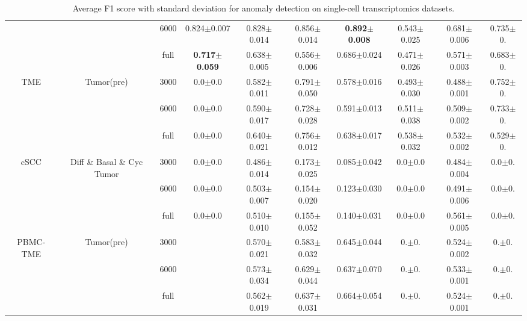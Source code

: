 \documentclass{article}
\begin{document}
\begin{table}
{\begin{tabular}{cccccccccc}
        & & 6000 & 0.824$\pm$0.007 & 0.828$\pm$0.014 & 0.856$\pm$0.014 & \textbf{0.892$\pm$0.008} & 0.543$\pm$0.025 & 0.681$\pm$0.006 & 0.735$\pm$0. \\
        & & full & \textbf{0.717$\pm$0.059} & 0.638$\pm$0.005 & 0.556$\pm$0.006 & 0.686$\pm$0.024 & 0.471$\pm$0.026 & 0.571$\pm$0.003 & 0.683$\pm$0. \\
        \hline
        \multirow{3}{*}{\centering TME} & \multirow{3}{*}{\centering Tumor(pre)} & 3000 & 0.0$\pm$0.0 & 0.582$\pm$0.011 & 0.791$\pm$0.050 & 0.578$\pm$0.016 & 0.493$\pm$0.030 & 0.488$\pm$0.001 & 0.752$\pm$0. \\
        & & 6000 & 0.0$\pm$0.0 & 0.590$\pm$0.017 & 0.728$\pm$0.028 & 0.591$\pm$0.013 & 0.511$\pm$0.038 & 0.509$\pm$0.002 & 0.733$\pm$0. \\
        & & full & 0.0$\pm$0.0 & 0.640$\pm$0.021 & 0.756$\pm$0.012 & 0.638$\pm$0.017 & 0.538$\pm$0.032 & 0.532$\pm$0.002 & 0.529$\pm$0. \\
        \hline
        \multirow{3}{*}{\centering cSCC} & \multirow{3}{*}{\centering Diff \& Basal \& Cyc Tumor} & 3000 & 0.0$\pm$0.0 & 0.486$\pm$0.014 & 0.173$\pm$0.025 & 0.085$\pm$0.042 & 0.0$\pm$0.0 & 0.484$\pm$0.004 & 0.0$\pm$0. \\
        & & 6000 & 0.0$\pm$0.0 & 0.503$\pm$0.007 & 0.154$\pm$0.020 & 0.123$\pm$0.030 & 0.0$\pm$0.0 & 0.491$\pm$0.006 & 0.0$\pm$0. \\
        & & full & 0.0$\pm$0.0 & 0.510$\pm$0.010 & 0.155$\pm$0.052 & 0.140$\pm$0.031 & 0.0$\pm$0.0 & 0.561$\pm$0.005 & 0.0$\pm$0. \\
        \hline
        \multirow{3}{*}{\centering PBMC-TME} & \multirow{3}{*}{\centering Tumor(pre)} & 3000 & & 0.570$\pm$0.021 & 0.583$\pm$0.032 & 0.645$\pm$0.044 & 0.$\pm$0. & 0.524$\pm$0.002 & 0.$\pm$0.  \\
        & & 6000 & & 0.573$\pm$0.034 & 0.629$\pm$0.044 & 0.637$\pm$0.070 & 0.$\pm$0. & 0.533$\pm$0.001 & 0.$\pm$0. \\
        & & full & & 0.562$\pm$0.019 & 0.637$\pm$0.031 & 0.664$\pm$0.054 & 0.$\pm$0. & 0.524$\pm$0.001 & 0.$\pm$0. \\
        \hline
    \end{tabular}
    }
    \caption{Average F1 score with standard deviation for anomaly detection on single-cell transcriptomics datasets.}
    \label{tab:plain}
\end{table}
\end{document}
